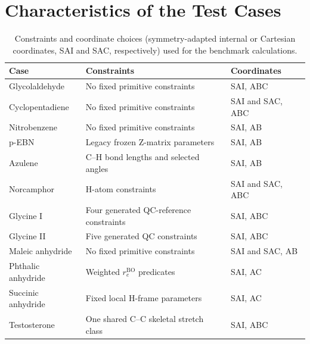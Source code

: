 \documentclass[12pt]{article}
\begin{document}
\section{Characteristics of the Test Cases}

\begin{table}
\caption{Constraints and coordinate choices (symmetry-adapted internal or Cartesian coordinates, SAI and SAC, respectively) used for the benchmark calculations.}
\label{tab:si-reproducibility}

\begin{tabular}{lll}
\toprule
Case & Constraints & Coordinates \\
\midrule
Glycolaldehyde  & No fixed primitive constraints         & SAI, ABC \\
Cyclopentadiene & No fixed primitive constraints         & SAI and SAC, ABC \\
Nitrobenzene    & No fixed primitive constraints         & SAI, AB \\
p-EBN           & Legacy frozen Z-matrix parameters      & SAI, AB \\
Azulene         & C--H bond lengths and selected angles  & SAI, AB \\
Norcamphor      & H-atom constraints                     & SAI and SAC, ABC \\
Glycine I       & Four generated QC-reference constraints        & SAI, ABC \\
Glycine II      & Five generated QC constraints      & SAI, ABC \\
Maleic anhydride & No fixed primitive constraints        & SAI and SAC, AB \\
Phthalic anhydride & Weighted $r_e^\mathrm{BO}$ predicates & SAI, AC \\
Succinic anhydride & Fixed local H-frame parameters       & SAI, AC \\
Testosterone & One shared C--C skeletal stretch class   & SAI, ABC \\
\bottomrule
\end{tabular}

\end{table}
\end{document}
